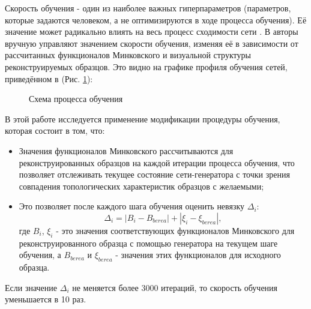 			Скорость обучения - один из наиболее важных гиперпараметров (параметров, которые задаются человеком, а не оптимизируются в ходе процесса обучения). Её значение может радикально влиять на весь процесс сходимости сети \cite{Smith}. В \cite{Mosser} авторы вручную управляют значением скорости обучения, изменяя её в зависимости от рассчитанных функционалов Минковского и визуальной структуры реконструируемых образцов. Это видно на графике профиля обучения сетей, приведённом в \cite{Mosser} (Рис. \ref{2-berea-curve}):
			
			\begin{figure}[h!]
				\caption{Схема процесса обучения \cite{Mosser}}
				\label{2-berea-curve}
			\end{figure}
		
			В этой работе исследуется применение модификации процедуры обучения, которая состоит в том, что:
			
			\begin{itemize}
				\item Значения функционалов Минковского рассчитываются для реконструированных образцов на каждой итерации процесса обучения, что позволяет отслеживать текущее состояние сети-генератора с точки зрения совпадения топологических характеристик образцов с желаемыми;
				\item Это позволяет после каждого шага обучения оценить невязку $\Delta_i$:
					\[ \Delta_i = |B_i - B_{berea}| + |\xi_i - \xi_{berea}|, \]
					где $B_i$, $\xi_i$ - это значения соответствующих функционалов Минковского для реконструированного образца с помощью генератора на текущем шаге обучения, а $B_{berea}$ и $\xi_{berea}$ - значения этих функционалов для исходного образца.
			\end{itemize}
			Если значение $\Delta_i$ не меняется более 3000 итераций, то скорость обучения уменьшается в 10 раз.